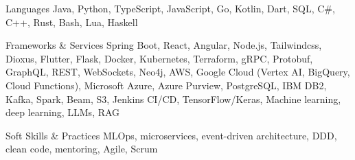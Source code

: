 

\begin{cvskills}

  \cvskill
    {Languages}
    {Java, Python, TypeScript, JavaScript, Go, Kotlin, Dart, SQL, C\#, C++, Rust, Bash, Lua, Haskell}

  \cvskill
    {Frameworks \& Services}
    {Spring Boot, React, Angular, Node.js, Tailwindcss, Dioxus, Flutter, Flask, Docker, Kubernetes, Terraform, gRPC, Protobuf, GraphQL, REST, WebSockets, Neo4j, AWS, Google Cloud (Vertex AI, BigQuery, Cloud Functions), Microsoft Azure, Azure Purview, PostgreSQL, IBM DB2, Kafka, Spark, Beam, S3, Jenkins CI/CD, TensorFlow/Keras, Machine learning, deep learning, LLMs, RAG}

  \cvskill
    {Soft Skills \& Practices}
    {MLOps, microservices, event-driven architecture, DDD, clean code, mentoring, Agile, Scrum}

\end{cvskills}
